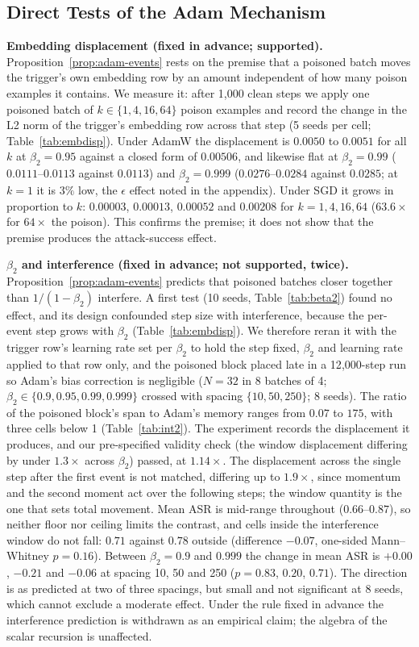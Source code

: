 \documentclass{article} %
\begin{document}
\subsection{Direct Tests of the Adam Mechanism}
\label{sec:direct}

\textbf{Embedding displacement (fixed in advance; supported).} Proposition~\ref{prop:adam-events}
rests on the premise that a poisoned batch moves the trigger's own embedding row by an amount
independent of how many poison examples it contains. We measure it: after 1{,}000 clean steps we
apply one poisoned batch of $k\in\{1,4,16,64\}$ poison examples and record the change in the L2
norm of the trigger's embedding row across that step (5 seeds per cell; Table~\ref{tab:embdisp}).
Under AdamW the displacement is $0.0050$ to $0.0051$ for all $k$ at $\beta_2=0.95$ against a closed
form of $0.00506$, and likewise flat at $\beta_2=0.99$ ($0.0111$--$0.0113$ against $0.0113$) and
$\beta_2=0.999$ ($0.0276$--$0.0284$ against $0.0285$; at $k=1$ it is $3\%$ low, the $\epsilon$ effect
noted in the appendix). Under SGD it grows in proportion to $k$: $0.00003$, $0.00013$, $0.00052$ and
$0.00208$ for $k=1,4,16,64$ ($63.6\times$ for $64\times$ the poison). This confirms the premise; it
does not show that the premise produces the attack-success effect.

\textbf{$\beta_2$ and interference (fixed in advance; not supported, twice).}
Proposition~\ref{prop:adam-events} predicts that poisoned batches closer together than
$1/(1-\beta_2)$ interfere. A first test (10 seeds, Table~\ref{tab:beta2}) found no effect,
and its design confounded step size with interference, because the per-event step grows with
$\beta_2$ (Table~\ref{tab:embdisp}). We therefore reran it with the trigger row's learning rate
set per $\beta_2$ to hold the step fixed, $\beta_2$ and learning rate applied to that row only,
and the poisoned block placed late in a 12{,}000-step run so Adam's bias correction is
negligible ($N=32$ in 8 batches of 4; $\beta_2\in\{0.9,0.95,0.99,0.999\}$ crossed with spacing
$\{10,50,250\}$; 8 seeds). The ratio of the poisoned block's span to Adam's memory ranges from $0.07$ to $175$, with three cells below 1 (Table~\ref{tab:int2}). The experiment records the displacement it produces,
and our pre-specified validity check (the window displacement differing by under $1.3\times$
across $\beta_2$) passed, at $1.14\times$. The displacement across the single step after the
first event is not matched, differing up to $1.9\times$, since momentum and the second moment
act over the following steps; the window quantity is the one that sets total movement. Mean ASR
is mid-range throughout ($0.66$--$0.87$), so neither floor nor ceiling limits the contrast, and
cells inside the interference window do not fall: $0.71$ against $0.78$ outside (difference
$-0.07$, one-sided Mann--Whitney $p=0.16$). Between $\beta_2=0.9$ and $0.999$ the change in mean
ASR is $+0.00$, $-0.21$ and $-0.06$ at spacing 10, 50 and 250 ($p=0.83$, $0.20$, $0.71$). The direction is as predicted at two of three
spacings, but small and not significant at 8 seeds, which cannot exclude a moderate effect. Under
the rule fixed in advance the interference prediction is withdrawn as an empirical claim; the
algebra of the scalar recursion is unaffected.
\end{document}
